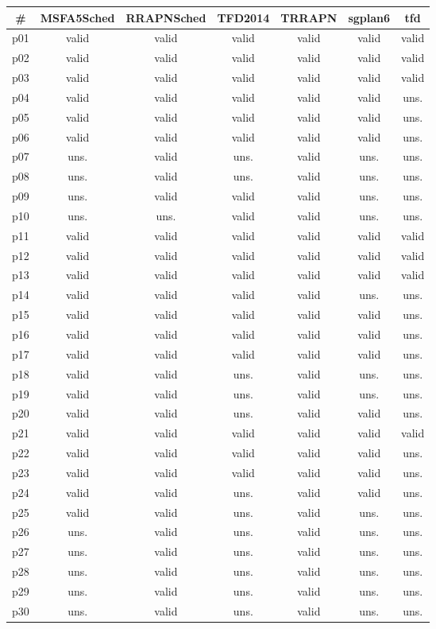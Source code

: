 \begin{tabular}{c||c|c|c|c|c|c}
\textbf{\#} & \textbf{MSFA5Sched} & \textbf{RRAPNSched} & \textbf{TFD2014} & \textbf{TRRAPN} & \textbf{sgplan6} & \textbf{tfd}\\
\hline
\hline
p01 & valid & valid & valid & valid & valid & valid\\
p02 & valid & valid & valid & valid & valid & valid\\
p03 & valid & valid & valid & valid & valid & valid\\
p04 & valid & valid & valid & valid & valid & uns.\\
p05 & valid & valid & valid & valid & valid & uns.\\
p06 & valid & valid & valid & valid & valid & uns.\\
p07 & uns. & valid & uns. & valid & uns. & uns.\\
p08 & uns. & valid & uns. & valid & uns. & uns.\\
p09 & uns. & valid & valid & valid & uns. & uns.\\
p10 & uns. & uns. & valid & valid & uns. & uns.\\
p11 & valid & valid & valid & valid & valid & valid\\
p12 & valid & valid & valid & valid & valid & valid\\
p13 & valid & valid & valid & valid & valid & valid\\
p14 & valid & valid & valid & valid & uns. & uns.\\
p15 & valid & valid & valid & valid & valid & uns.\\
p16 & valid & valid & valid & valid & valid & uns.\\
p17 & valid & valid & valid & valid & valid & uns.\\
p18 & valid & valid & uns. & valid & uns. & uns.\\
p19 & valid & valid & uns. & valid & uns. & uns.\\
p20 & valid & valid & uns. & valid & valid & uns.\\
p21 & valid & valid & valid & valid & valid & valid\\
p22 & valid & valid & valid & valid & valid & uns.\\
p23 & valid & valid & valid & valid & valid & uns.\\
p24 & valid & valid & uns. & valid & valid & uns.\\
p25 & valid & valid & uns. & valid & uns. & uns.\\
p26 & uns. & valid & uns. & valid & uns. & uns.\\
p27 & uns. & valid & uns. & valid & uns. & uns.\\
p28 & uns. & valid & uns. & valid & uns. & uns.\\
p29 & uns. & valid & uns. & valid & uns. & uns.\\
p30 & uns. & valid & uns. & valid & uns. & uns.\\
\end{tabular}

